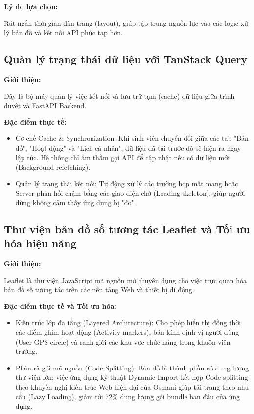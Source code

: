 \textbf{Lý do lựa chọn:} 

Rút ngắn thời gian dàn trang (layout), giúp tập trung nguồn lực vào các logic xử lý bản đồ và kết nối API phức tạp hơn.

\subsection{Quản lý trạng thái dữ liệu với TanStack Query}

\textbf{Giới thiệu:} 

Đây là bộ máy quản lý việc kết nối và lưu trữ tạm (cache) dữ liệu giữa trình duyệt và FastAPI Backend\cite{tanstack2024query}.

\textbf{Đặc điểm thực tế:}

\begin{itemize}
    \item Cơ chế Cache \& Synchronization: Khi sinh viên chuyển đổi giữa các tab "Bản đồ", "Hoạt động" và "Lịch cá nhân", dữ liệu đã tải trước đó sẽ hiện ra ngay lập tức. Hệ thống chỉ âm thầm gọi API để cập nhật nếu có dữ liệu mới (Background refetching).

    \item Quản lý trạng thái kết nối: Tự động xử lý các trường hợp mất mạng hoặc Server phản hồi chậm bằng các giao diện chờ (Loading skeleton), giúp người dùng không cảm thấy ứng dụng bị "đơ".
\end{itemize}

\subsection{Thư viện bản đồ số tương tác Leaflet và Tối ưu hóa hiệu năng}

\textbf{Giới thiệu:}

Leaflet là thư viện JavaScript mã nguồn mở chuyên dụng cho việc trực quan hóa bản đồ số tương tác trên các nền tảng Web và thiết bị di động\cite{leafletjs2011}.

\textbf{Đặc điểm thực tế và Tối ưu hóa:}

\begin{itemize}
    \item Kiến trúc lớp đa tầng (Layered Architecture): Cho phép hiển thị đồng thời các điểm ghim hoạt động (Activity markers), bán kính định vị người dùng (User GPS circle) và ranh giới các khu vực chức năng trong khuôn viên trường.
    \item Phân rã gói mã nguồn (Code-Splitting): Bản đồ là thành phần có dung lượng thư viện lớn; việc ứng dụng kỹ thuật Dynamic Import kết hợp Code-splitting theo khuyến nghị kiến trúc Web hiện đại của Osmani\cite{osmani2021patterns} giúp tải trang theo nhu cầu (Lazy Loading), giảm tới 72\% dung lượng gói bundle ban đầu của ứng dụng.
\end{itemize}

